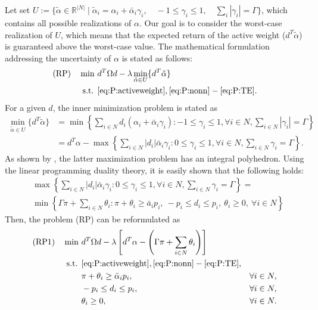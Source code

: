 \documentclass[11pt]{article}
\begin{document}
	Let set $U := \{ \tilde \alpha \in \mathbb{R}^{|N|}  \mid \tilde \alpha_i = \alpha_i + \bar{\alpha}_i \gamma_i , \quad -1 \leq \gamma_i\leq 1 , \quad \sum_{i} |\gamma_i| = \Gamma \}$, which contains all possible realizations of $\alpha$. Our goal is to consider the worst-case realization of $U$, which means that the expected return of the active weight ($d^T \tilde{\alpha}$) is guaranteed above the worst-case value. The mathematical formulation addressing the uncertainty of $\alpha$ is stated as follows:
	\begin{align}
	\text{(RP)} \quad \min~ & d^T \Omega d - \lambda \min_{\tilde{\alpha} \in U} \{d^T \tilde{\alpha} \} \label{eq:RP:obj}\\
	\text{s.t. } 
	& \eqref{eq:P:activeweight}, \eqref{eq:P:nonn} - \eqref{eq:P:TE}. \notag
	\end{align}
	For a given $d$, the inner minimization problem is stated as
	\begin{align}
	\min_{\tilde{\alpha} \in U} \{ d^T \tilde{\alpha} \} &= \min \left\{ \sum_{i \in N} d_i (\alpha_i + \bar{\alpha}_i \gamma_i ) : -1 \le \gamma_i \le 1, \forall i \in N, \sum_{i \in N} |\gamma_i| = \Gamma  \right\}\\
	&= d^T \alpha - \max \left\{ \sum_{i \in N} |d_i| \bar{\alpha}_i \gamma_i : 0 \le \gamma_i \le 1, \forall i \in N, \sum_{i \in N} \gamma_i = \Gamma  \right\}.
	\end{align}
	As shown by \cite{bertsimas2004price}, the latter maximization problem has an integral polyhedron. Using the linear programming duality theory, it is easily shown that the following holds:
	\begin{align}
	&\max \left\{ \sum_{i \in N} |d_i| \bar{\alpha}_i \gamma_i : 0 \le \gamma_i \le 1, \forall i \in N, \sum_{i \in N} \gamma_i = \Gamma  \right\} =\\
	&\min \left\{ \Gamma \pi + \sum_{i \in N} \theta_i : \pi + \theta_i \ge \bar{a}_i p_i,~ -p_i \le d_i \le p_i,~ \theta_i \ge 0, ~\forall i \in N   \right\}
	\end{align}
	Then, the problem (RP) can be reformulated as
	\begin{align}
	\text{(RP1)} \quad \min~ & d^T \Omega d - \lambda \left[ d^T \alpha - \left(\Gamma \pi + \sum_{i \in N} \theta_i \right) \right] \label{eq:RP1:obj}\\
	\text{s.t. } 
	& \eqref{eq:P:activeweight}, \eqref{eq:P:nonn} - \eqref{eq:P:TE}, \notag\\
	& \pi + \theta_i \ge \bar{\alpha}_i p_i, & \forall i \in N, \\
	& -p_i \le d_i \le p_i, & \forall i \in N,\\
	& \theta_i \ge 0, & \forall i \in N.
	\end{align}
\end{document}
